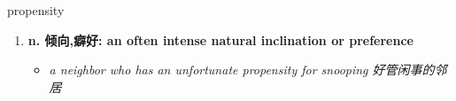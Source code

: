 
\begin{frame}
{\huge propensity}
\begin{center}
\begin{enumerate}\Large
  \item \textbf{n. 倾向,癖好: an often intense natural inclination or preference}
  \begin{itemize}
    \item \em{\Large{a neighbor who has an unfortunate propensity for snooping 好管闲事的邻居}}
  \end{itemize}
\end{enumerate}
\end{center}
\end{frame}
